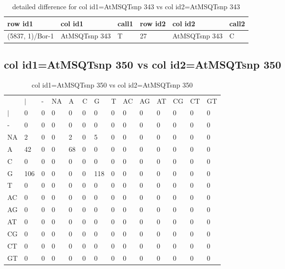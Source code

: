 \begin{center}
\begin{longtable}{|l|l|l|l|l|l|}
\caption{detailed difference for col id1=AtMSQTsnp 343 vs col id2=AtMSQTsnp 343} \label{table_dm871}\\
\hline
row id1&col id1&call1&row id2&col id2&call2\\
\hline
(5837, 1)/Bor-1&AtMSQTsnp 343&T&27&AtMSQTsnp 343&C\\
\hline
\end{longtable}
\end{center}

\subsection{col id1=AtMSQTsnp 350 vs col id2=AtMSQTsnp 350}
\begin{center}
\begin{longtable}{|l|l|l|l|l|l|l|l|l|l|l|l|l|l|}
\caption{col id1=AtMSQTsnp 350 vs col id2=AtMSQTsnp 350} \label{table_dm872}\\
\hline
\\
\hline
&$|$&-&NA&A&C&G&T&AC&AG&AT&CG&CT&GT\\
$|$&0&0&0&0&0&0&0&0&0&0&0&0&0\\
-&0&0&0&0&0&0&0&0&0&0&0&0&0\\
NA&2&0&0&2&0&5&0&0&0&0&0&0&0\\
A&42&0&0&68&0&0&0&0&0&0&0&0&0\\
C&0&0&0&0&0&0&0&0&0&0&0&0&0\\
G&106&0&0&0&0&118&0&0&0&0&0&0&0\\
T&0&0&0&0&0&0&0&0&0&0&0&0&0\\
AC&0&0&0&0&0&0&0&0&0&0&0&0&0\\
AG&0&0&0&0&0&0&0&0&0&0&0&0&0\\
AT&0&0&0&0&0&0&0&0&0&0&0&0&0\\
CG&0&0&0&0&0&0&0&0&0&0&0&0&0\\
CT&0&0&0&0&0&0&0&0&0&0&0&0&0\\
GT&0&0&0&0&0&0&0&0&0&0&0&0&0\\
\hline
\end{longtable}
\end{center}

